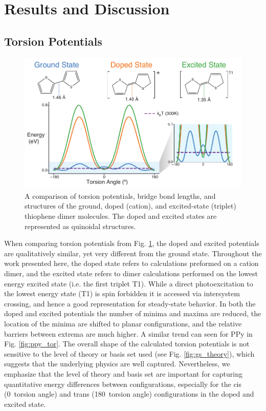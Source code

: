 \section{Results and Discussion}
\subsection{Torsion Potentials}

\begin{figure}[hbt!]
    \centering
    \includegraphics{figures/chap2/tor_compare.pdf}
    \caption{A comparison of torsion potentials, bridge bond lengths, and structures of the ground, doped (cation), and excited-state (triplet) thiophene dimer molecules. The doped and excited states are represented as quinoidal structures.}
    \label{fig:comp_tor}
\end{figure}

When comparing torsion potentials from Fig. \ref{fig:comp_tor}, the doped and excited potentials are qualitatively similar, yet very different from the ground state. Throughout the work presented here, the doped state refers to calculations preformed on a cation dimer, and the excited state refers to dimer calculations performed on the lowest energy excited state (i.e. the first triplet T1). While a direct photoexcitation to the lowest energy state (T1) is spin forbidden it is accessed via intersystem crossing,\cite{Beljonne2001, Banerji2011, Kolle2016} and hence a good representation for steady-state behavior. In both the doped and excited potentials the number of minima and maxima are reduced, the location of the minima are shifted to planar configurations, and the relative barriers between extrema are much higher. A similar trend can seen for PPy in Fig. \ref{fig:ppy_tor}. The overall shape of the calculated torsion potentials is not sensitive to the level of theory or basis set used (see Fig. \ref{fig:gs_theory}), which suggests that the underlying physics are well captured. Nevertheless, we emphasize that the level of theory and basis set are important for capturing quantitative energy differences between configurations, especially for the cis (0\textdegree \ torsion angle) and trans (180\textdegree \ torsion angle) configurations in the doped and excited state.

